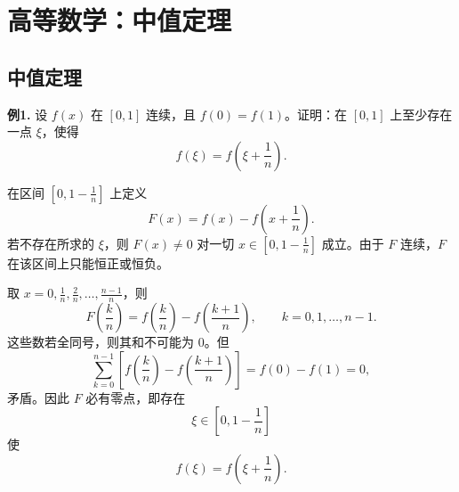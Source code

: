\chapter{高等数学：中值定理}

\section{中值定理}

\begin{problemblock}
\textbf{例1.} 设 \(f(x)\) 在 \([0,1]\) 连续，且 \(f(0)=f(1)\)。证明：在 \([0,1]\) 上至少存在一点 \(\xi\)，使得
\[
f(\xi)=f\left(\xi+\frac1n\right).
\]
\end{problemblock}
\begin{solutionblock}
在区间 \(\left[0,1-\frac1n\right]\) 上定义
\[
F(x)=f(x)-f\left(x+\frac1n\right).
\]
若不存在所求的 \(\xi\)，则 \(F(x)\ne0\) 对一切 \(x\in[0,1-\frac1n]\) 成立。由于 \(F\) 连续，\(F\) 在该区间上只能恒正或恒负。

取 \(x=0,\frac1n,\frac2n,\ldots,\frac{n-1}{n}\)，则
\[
F\left(\frac{k}{n}\right)
=f\left(\frac{k}{n}\right)-f\left(\frac{k+1}{n}\right),\qquad k=0,1,\ldots,n-1.
\]
这些数若全同号，则其和不可能为 \(0\)。但
\[
\sum_{k=0}^{n-1}
\left[
f\left(\frac{k}{n}\right)-f\left(\frac{k+1}{n}\right)
\right]
=f(0)-f(1)=0,
\]
矛盾。因此 \(F\) 必有零点，即存在
\[
\xi\in\left[0,1-\frac1n\right]
\]
使
\[
f(\xi)=f\left(\xi+\frac1n\right).
\]
\end{solutionblock}


